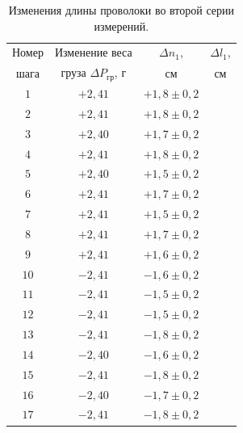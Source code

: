 \documentclass[a4paper,11pt]{article}
\begin{document}
\begin{table}[h!]
\centering
\begin{tabular}{ ||c|c|c|c|| }
  \hline
  Номер & Изменение веса & $\Delta n_{1}$, & $\Delta l_{1}$, \\
  шага & груза $\Delta P_{гр}$, $г$ & $см$ & $см$ \\
  \hline
  $1$ & $+2,41$ & $+1,8 \pm 0,2$ & \\
  $2$ & $+2,41$ & $+1,8 \pm 0,2$ & \\
  $3$ & $+2,40$ & $+1,7 \pm 0,2$ & \\
  $4$ & $+2,41$ & $+1,8 \pm 0,2$ & \\
  $5$ & $+2,40$ & $+1,5 \pm 0,2$ & \\
  $6$ & $+2,41$ & $+1,7 \pm 0,2$ & \\
  $7$ & $+2,41$ & $+1,5 \pm 0,2$ & \\
  $8$ & $+2,41$ & $+1,7 \pm 0,2$ & \\
  $9$ & $+2,41$ & $+1,6 \pm 0,2$ & \\
  $10$ & $-2,41$ & $-1,6 \pm 0,2$ & \\
  $11$ & $-2,41$ & $-1,5 \pm 0,2$ & \\
  $12$ & $-2,41$ & $-1,5 \pm 0,2$ & \\
  $13$ & $-2,41$ & $-1,8 \pm 0,2$ & \\
  $14$ & $-2,40$ & $-1,6 \pm 0,2$ & \\
  $15$ & $-2,41$ & $-1,8 \pm 0,2$ & \\
  $16$ & $-2,40$ & $-1,7 \pm 0,2$ & \\
  $17$ & $-2,41$ & $-1,8 \pm 0,2$ & \\
  \hline
\end{tabular}
\caption{Изменения длины проволоки во второй серии измерений.}
\label{table:tab2}
\end{table}
\end{document}
